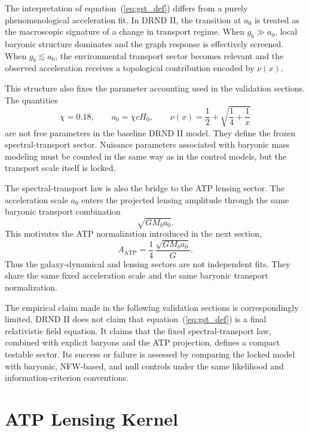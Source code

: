\documentclass[12pt]{iopart}
\begin{document}
The interpretation of equation~(\ref{eq:gst_def}) differs from a purely phenomenological acceleration fit. In DRND II, the transition at \(a_0\) is treated as the macroscopic signature of a change in transport regime. When \(g_b\gg a_0\), local baryonic structure dominates and the graph response is effectively screened. When \(g_b\lesssim a_0\), the environmental transport sector becomes relevant and the observed acceleration receives a topological contribution encoded by \(\nu(x)\).

This structure also fixes the parameter accounting used in the validation sections. The quantities
\begin{equation}
\chi=0.18,
\qquad
a_0=\chi cH_0,
\qquad
\nu(x)=\frac12+\sqrt{\frac14+\frac1x}
\end{equation}
are not free parameters in the baseline DRND II model. They define the frozen spectral-transport sector. Nuisance parameters associated with baryonic mass modeling must be counted in the same way as in the control models, but the transport scale itself is locked.

The spectral-transport law is also the bridge to the ATP lensing sector. The acceleration scale \(a_0\) enters the projected lensing amplitude through the same baryonic transport combination
\begin{equation}
\sqrt{GM_ba_0}.
\end{equation}
This motivates the ATP normalization introduced in the next section,
\begin{equation}
A_{\mathrm{ATP}}
=
\frac14\,\frac{\sqrt{GM_ba_0}}{G}.
\end{equation}
Thus the galaxy-dynamical and lensing sectors are not independent fits. They share the same fixed acceleration scale and the same baryonic transport normalization.

The empirical claim made in the following validation sections is correspondingly limited. DRND II does not claim that equation~(\ref{eq:gst_def}) is a final relativistic field equation. It claims that the fixed spectral-transport law, combined with explicit baryons and the ATP projection, defines a compact testable sector. Its success or failure is assessed by comparing the locked model with baryonic, NFW-based, and null controls under the same likelihood and information-criterion conventions.

\section{ATP Lensing Kernel}
\label{sec:atp_lensing}
\end{document}
